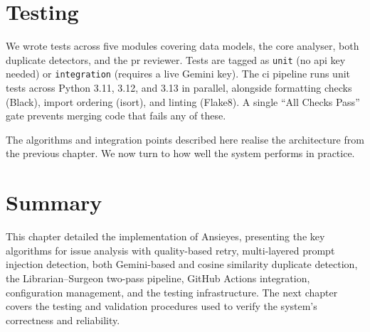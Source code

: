 \section{Testing}

We wrote tests across five modules covering data models, the core analyser, both duplicate detectors, and the \gls{pr} reviewer. Tests are tagged as \texttt{unit} (no \gls{api} key needed) or \texttt{integration} (requires a live Gemini key). The \gls{ci} pipeline runs unit tests across Python 3.11, 3.12, and 3.13 in parallel, alongside formatting checks (Black), import ordering (isort), and linting (Flake8). A single ``All Checks Pass'' gate prevents merging code that fails any of these.

The algorithms and integration points described here realise the architecture from the previous chapter. We now turn to how well the system performs in practice.

\section{Summary}

This chapter detailed the implementation of Ansieyes, presenting the key algorithms for issue analysis with quality-based retry, multi-layered prompt injection detection, both Gemini-based and cosine similarity duplicate detection, the Librarian--Surgeon two-pass pipeline, GitHub Actions integration, configuration management, and the testing infrastructure. The next chapter covers the testing and validation procedures used to verify the system's correctness and reliability.
